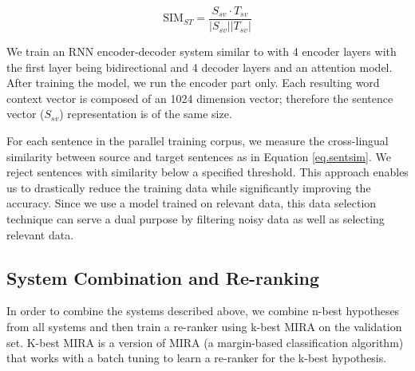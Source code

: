 \documentclass[a4paper]{article}
\begin{document}
\begin{CJK*}{UTF8}{gbsn}
\begin{equation}
	\mathrm{SIM}_{ST} = \dfrac{S_{sv}\cdot T_{sv}} {\vert{S_{sv}}\vert \vert{T_{sv}}\vert}	 \label{eq.sentsim} 
\end{equation}

We train an RNN encoder-decoder system similar to \cite{wu2016google} with 4 encoder layers  with the first layer being bidirectional and 4 decoder layers and an attention model.   After training the model, we run the encoder part only.  Each resulting word context vector is composed of an 1024 dimension  vector; therefore the sentence vector ($S_{sv}$) representation is of the same size.

For each sentence in the parallel training corpus, we measure the cross-lingual  similarity between source and target sentences as in Equation \ref{eq.sentsim}. We reject sentences with  similarity below a specified threshold. This approach enables us to drastically reduce the training data while significantly improving the accuracy. Since we use a model trained on relevant data, this data selection technique can serve a dual purpose by filtering noisy data as well as selecting relevant data.




\subsection{System Combination and Re-ranking}
\label{sec.sc}
In order to combine the systems described above, we combine n-best hypotheses from all systems and then train a re-ranker using k-best MIRA on the validation set. K-best MIRA \cite{kb-mira}  is a version of MIRA (a margin-based classification algorithm) that  works with a batch tuning  to learn a re-ranker for the k-best hypothesis.


\end{CJK*}
\end{document}
